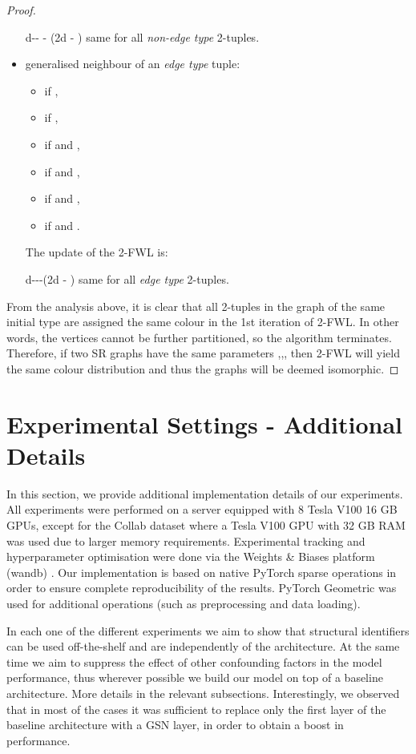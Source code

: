 \documentclass{article} \usepackage{iclr2021_conference,times}
\begin{document}
\begin{proof}
\begin{itemize}
     d-\mud- - (2d - \mu)\mu
same for all \textit{non-edge type} 2-tuples.

    
    \item generalised neighbour of an \textit{edge type} tuple:  
    \begin{itemize}
        \item  if , 
        \item  if , 
        \item  if  and , 
        \item  if  and , 
        \item  if  and , 
        \item  if  and .
    \end{itemize}
    The update of the 2-FWL is:
     
     d-\lambdad--(2d - \lambda)\lambda
same for all \textit{edge type} 2-tuples.
\end{itemize}

From the analysis above, it is clear that all 2-tuples in the graph of the same initial type are assigned the same colour in the 1st iteration of 2-FWL. In other words, the vertices cannot be further partitioned, so the algorithm terminates. Therefore, if two SR graphs have the same parameters ,,, then 2-FWL will yield the same colour distribution and thus the graphs will be deemed isomorphic.

\end{proof}

\section{Experimental Settings - Additional Details}\label{experiments_supp}

In this section, we provide additional implementation details of our experiments. All experiments were performed on a server equipped with 8 Tesla V100 16 GB GPUs, except for the Collab dataset where a Tesla V100 GPU with 32 GB RAM was used due to larger memory requirements.
Experimental tracking and hyperparameter optimisation were done via the Weights \& Biases platform (wandb) \citep{wandb}. Our implementation is based on native PyTorch sparse operations \citep{paszke2019pytorch} in order to ensure complete reproducibility of the results. PyTorch Geometric \citep{DBLP:journals/corr/abs-1903-02428} was used for additional operations (such as preprocessing and data loading).

In each one of the different experiments we aim to show that structural identifiers can be used off-the-shelf and are independently of the architecture. At the same time we aim to suppress the effect of other confounding factors in the model performance, thus wherever possible we build our model on top of a baseline architecture. More details in the relevant subsections. Interestingly, we observed that in most of the cases it was sufficient to replace only the first layer of the baseline architecture with a GSN layer, in order to obtain a boost in performance.
\end{document}
